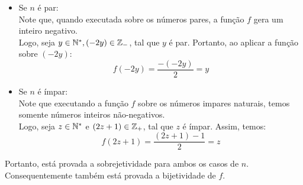 \begin{itemize}
    \item Se $n$ é par: \\
    Note que, quando executada sobre os números pares, a função $f$ gera um inteiro negativo. \\
    Logo, seja $y \in \mathbb N^*, (-2y) \in \mathbb Z_-$, tal que $y$ é par. Portanto, ao aplicar a função sobre $(-2y)$:
    \begin{displaymath}
        f(-2y) = \frac{-(-2y)}{2} = y
    \end{displaymath}
    \item Se $n$ é ímpar: \\
    Note que executando a função $f$ sobre os números impares naturais, temos somente números inteiros não-negativos. \\
    Logo, seja $z \in \mathbb N^*$ e $(2z + 1) \in \mathbb Z_+$, tal que $z$ é ímpar. Assim, temos:
    \begin{displaymath}
        f(2z + 1) = \frac{(2z + 1) - 1}{2} = z
    \end{displaymath}
\end{itemize}
Portanto, está provada a sobrejetividade para ambos os casos de $n$. Consequentemente também está provada a bijetividade de $f$.